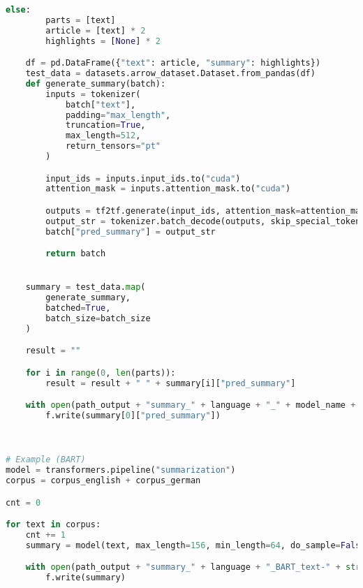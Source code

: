 \begin{lstlisting}[language=Python, caption=Beispielcode]
    else:
        parts = [text]
        article = [text] * 2
        highlights = [None] * 2

    df = pd.DataFrame({"text": article, "summary": highlights})
    test_data = datasets.arrow_dataset.Dataset.from_pandas(df)
    def generate_summary(batch):
        inputs = tokenizer(
            batch["text"],
            padding="max_length",
            truncation=True,
            max_length=512,
            return_tensors="pt"
        )

        input_ids = inputs.input_ids.to("cuda")
        attention_mask = inputs.attention_mask.to("cuda")

        outputs = tf2tf.generate(input_ids, attention_mask=attention_mask)
        output_str = tokenizer.batch_decode(outputs, skip_special_tokens=True)
        batch["pred_summary"] = output_str

        return batch


    summary = test_data.map(
        generate_summary,
        batched=True,
        batch_size=batch_size
    )

    result = ""

    for i in range(0, len(parts)):
        result = result + " " + summary[i]["pred_summary"]

    with open(path_output + "summary_" + language + "_" + model_name + "_text-" + str(cnt) + ".txt", "w", encoding="utf-8") as f:
        f.write(summary[0]["pred_summary"])
        


# Example (BART)
model = transformers.pipeline("summarization")
corpus = corpus_english + corpus_german

cnt = 0

for text in corpus:
    cnt += 1
    summary = model(text, max_length=156, min_length=64, do_sample=False)[0]["summary_text"]

    with open(path_output + "summary_" + language + "_BART_text-" + str(cnt) + ".txt", "w", encoding="utf-8") as f:
        f.write(summary)
\end{lstlisting}
